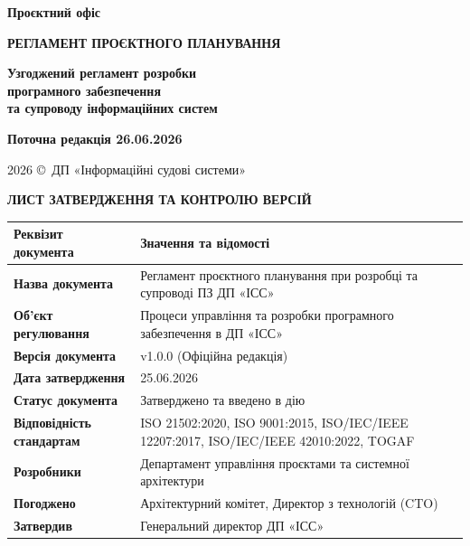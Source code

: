 \documentclass{article}
\newcommand\HUGE[1]{\fontsize{40}{40}\selectfont #1}
\begin{document}
\pagestyle{fancy}

\begin{titlepage}
  \AddToShipoutPictureBG*{\AtPageLowerLeft{\color{nato}\rule{\paperwidth}{\paperheight}}}
  \color{white}\thispagestyle{empty}\vspace*{3cm}\centering
  {\Huge \textbf{Проєктний офіс} \par} \vspace{1cm}
  {\HUGE \textbf{РЕГЛАМЕНТ ПРОЄКТНОГО ПЛАНУВАННЯ} \par} \vspace{2cm}
  {\LARGE \textbf{Узгоджений регламент розробки \\ програмного забезпечення \\ та супроводу інформаційних систем} \par} \vspace{1.5cm}
  {\large\textbf{Поточна редакція 26.06.2026} \par}
  \vfill
  {\large 2026 \copyright\ ДП «Інформаційні судові системи» \par}
\end{titlepage}

\newpage
\thispagestyle{empty}
\begin{center}
  {\Large\color{nato}\bfseries ЛИСТ ЗАТВЕРДЖЕННЯ ТА КОНТРОЛЮ ВЕРСІЙ\par}
\end{center}
\vspace{20pt}

\begin{longtable}{@{}p{4.0cm}p{10.2cm}@{}}
\toprule
\textbf{Реквізит документа} & \textbf{Значення та відомості} \\
\midrule
\textbf{Назва документа} & Регламент проєктного планування при розробці та супроводі ПЗ ДП «ІСС» \\
\textbf{Об'єкт регулювання} & Процеси управління та розробки програмного забезпечення в ДП «ІСС» \\
\textbf{Версія документа} & v1.0.0 (Офіційна редакція) \\
\textbf{Дата затвердження} & 25.06.2026 \\
\textbf{Статус документа} & Затверджено та введено в дію \\
\textbf{Відповідність стандартам} & ISO 21502:2020, ISO 9001:2015, ISO/IEC/IEEE 12207:2017, ISO/IEC/IEEE 42010:2022, TOGAF \\
\textbf{Розробники} & Департамент управління проєктами та системної архітектури \\
\textbf{Погоджено} & Архітектурний комітет, Директор з технологій (CTO) \\
\textbf{Затвердив} & Генеральний директор ДП «ІСС» \\
\bottomrule
\end{longtable}
\end{document}
